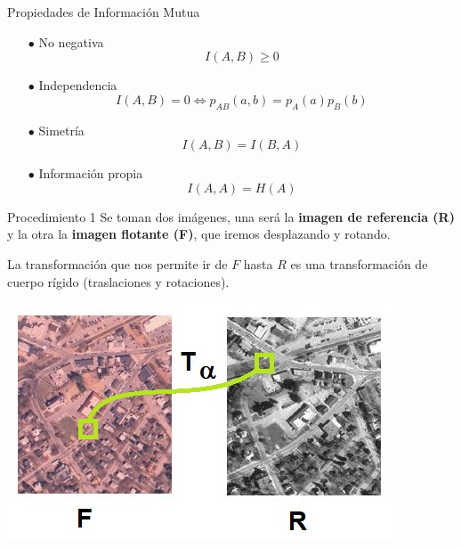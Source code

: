 \documentclass[14pt,xcolor={rgb}]{beamer}
\begin{document}
\begin{frame}{Propiedades de Informaci\'on Mutua}
\small
\begin{itemize}
	\item[$\bullet$] No negativa
	$$I(A,B)\geq 0$$
	\item[$\bullet$] Independencia
	$$I(A,B)=0 \iff p_{AB}(a,b)=p_A(a)p_B(b)$$
	\item[$\bullet$] Simetr\'ia $$I(A,B)=I(B,A)$$
	\item[$\bullet$] Informaci\'on propia $$I(A,A)=H(A)$$
\end{itemize}
\end{frame}


\begin{frame}{Procedimiento 1}
\small
Se toman dos im\'agenes, una ser\'a la \textbf{imagen de referencia (R)} y la otra la \textbf{imagen flotante (F)}, que iremos desplazando y rotando.

La transformaci\'on que nos permite ir de $F$ hasta $R$ es una transformaci\'on de cuerpo r\'igido (traslaciones y rotaciones).

\begin{center}
	\includegraphics[scale=0.5]{Images/transformacion.jpg}
\end{center}


\end{frame}
\end{document}
